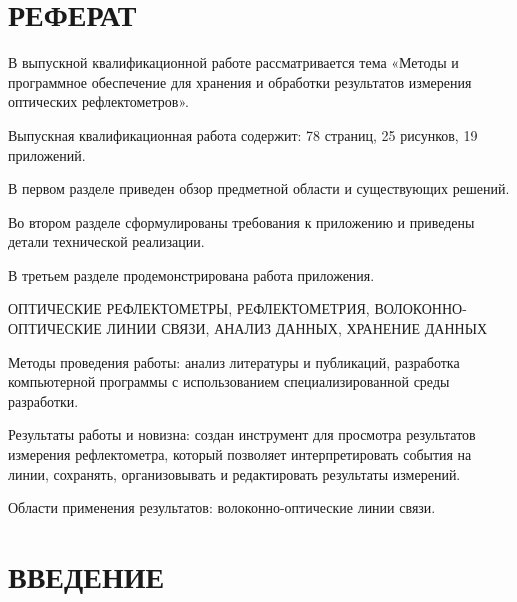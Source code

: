 \documentclass[a4paper]{article}
\begin{document}


\section*{РЕФЕРАТ}
\thispagestyle{empty}

В выпускной квалификационной работе рассматривается тема «Методы и программное обеспечение для хранения и обработки результатов измерения оптических рефлектометров».

Выпускная квалификационная работа содержит: 78 страниц, 25 рисунков, 19 приложений.

В первом разделе приведен обзор предметной области и существующих решений.

Во втором разделе сформулированы требования к приложению и приведены детали технической реализации.

В третьем разделе продемонстрирована работа приложения.

ОПТИЧЕСКИЕ РЕФЛЕКТОМЕТРЫ, РЕФЛЕКТОМЕТРИЯ, ВОЛОКОННО-ОПТИЧЕСКИЕ ЛИНИИ СВЯЗИ, АНАЛИЗ ДАННЫХ, ХРАНЕНИЕ ДАННЫХ

Методы проведения работы: анализ литературы и публикаций, разработка компьютерной программы с использованием специализированной среды разработки.

Результаты работы и новизна: создан инструмент для просмотра результатов измерения рефлектометра, который позволяет интерпретировать события на линии, сохранять, организовывать и редактировать результаты измерений.

Области применения результатов: волоконно-оптические линии связи.

\newpage
\renewcommand{\contentsname}{СОДЕРЖАНИЕ}
\tableofcontents
{}

\newpage
\thispagestyle{empty}
\printnoidxglossary[
  title={ПЕРЕЧЕНЬ СОКРАЩЕНИЙ И ОБОЗНАЧЕНИЙ},
  type=\acronymtype
]

\newpage
\thispagestyle{empty}
\printnoidxglossary[
  title={СПИСОК ТЕРМИНОВ}
]

\newpage
\setcounter{page}{12}
\section*{ВВЕДЕНИЕ}

\end{document}
